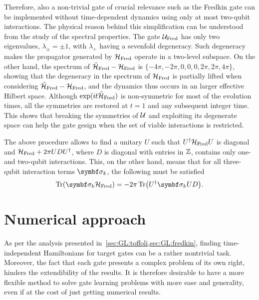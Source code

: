 Therefore, also a non-trivial gate of crucial relevance such as the Fredkin gate can be implemented without time-dependent dynamics using only at most two-qubit interactions.
The physical reason behind this simplification can be understood from the study of the spectral properties.
The gate ${\mathcal{U}}_{\operatorname{Fred}}$ has only two eigenvalues, $\lambda_\pm=\pm1$,
with $\lambda_+$ having a sevenfold degeneracy. Such degeneracy makes the propagator generated by ${\mathcal{H}}_{\operatorname{Fred}}$ operate in a two-level subspace.
On the other hand, the spectrum of $\tilde{{\mathcal{H}}}_{\operatorname{Fred}}-{\mathcal{H}}_{\operatorname{Fred}}$ is $\{{-}4\pi,{-}2\pi,0,0,0,2\pi,2\pi,4\pi\}$, showing that the degeneracy in the spectrum of ${\mathcal{H}}_{\operatorname{Fred}}$ is partially lifted when considering 
$\tilde{{\mathcal{H}}}_{\operatorname{Fred}}-{\mathcal{H}}_{\operatorname{Fred}}$, and the dynamics thus occurs in an  larger effective Hilbert space.  %
Although $\exponential(it\HTildeFred)$ is non-symmetric for most of the evolution times, all the symmetries are restored at $t=1$ and any subsequent integer time. This  shows that breaking the symmetries of ${\mathcal{U}}$ and exploiting its degenerate space can help the gate gesign when the set of viable interactions is restricted.

The above procedure allows to find a unitary $U$ such that
$U^\dagger{\mathcal{H}}_{\operatorname{Fred}} U$ is diagonal and
${\mathcal{H}}_{\operatorname{Fred}} + 2\pi U D U^\dagger$, where $D$ is diagonal with entries in $\mathbb{Z}$, contains only one- and two-qubit interactions.
This, on the other hand, means that for all three-qubit interaction terms $\bs\sigma_k$, the following must be satisfied
\begin{equation}
    \Tr(\bs\sigma_k\HFred) = -2\pi \Tr(U^\dagger\bs\sigma_k U D).
\end{equation}



\section{Numerical approach}
\label{sec:GL:numerical_approach}

As per the analysis presented in~\cref{sec:GL:toffoli,sec:GL:fredkin}, finding time-independent Hamiltonians for target gates can be a rather nontrivial task. 
Moreover, the fact that each gate presents a complex problem of its own right, hinders the extendibility of the results.
It is therefore desirable to have a more flexible method to solve gate learning problems with more ease and generality, even if at the cost of just getting numerical results.

